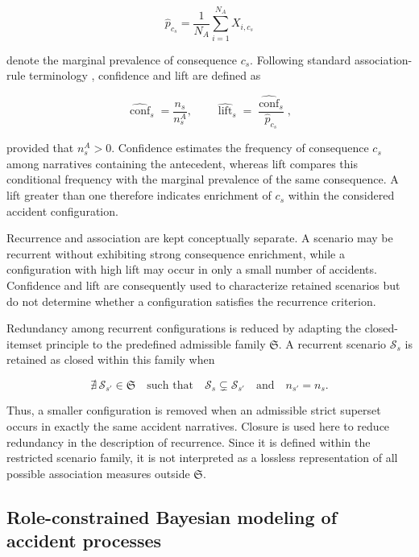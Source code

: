 \[
\widehat p_{c_s}
=
\frac{1}{N_A}
\sum_{i=1}^{N_A}X_{i,c_s}
\]

denote the marginal prevalence of consequence \(c_s\). Following standard
association-rule terminology
\citep{agrawal1993mining,brin1997dynamic}, confidence and lift are defined as

\[
\widehat{\operatorname{conf}}_s
=
\frac{n_s}{n_s^A},
\qquad
\widehat{\operatorname{lift}}_s
=
\frac{\widehat{\operatorname{conf}}_s}
     {\widehat p_{c_s}},
\]

provided that \(n_s^A>0\). Confidence estimates the frequency of consequence
\(c_s\) among narratives containing the antecedent, whereas lift compares this
conditional frequency with the marginal prevalence of the same consequence.
A lift greater than one therefore indicates enrichment of \(c_s\) within the
considered accident configuration.

Recurrence and association are kept conceptually separate. A scenario may be
recurrent without exhibiting strong consequence enrichment, while a
configuration with high lift may occur in only a small number of accidents.
Confidence and lift are consequently used to characterize retained scenarios
but do not determine whether a configuration satisfies the recurrence
criterion.

Redundancy among recurrent configurations is reduced by adapting the
closed-itemset principle \citep{pasquier1999discovering} to the predefined
admissible family \(\mathfrak S\). A recurrent scenario
\(\mathcal S_s\) is retained as closed within this family when

\[
\nexists\,
\mathcal S_{s'}\in\mathfrak S
\quad\text{such that}\quad
\mathcal S_s\subsetneq\mathcal S_{s'}
\quad\text{and}\quad
n_{s'}=n_s.
\]

Thus, a smaller configuration is removed when an admissible strict superset
occurs in exactly the same accident narratives. Closure is used here to
reduce redundancy in the description of recurrence. Since it is defined
within the restricted scenario family, it is not interpreted as a
lossless representation of all possible association measures outside
\(\mathfrak S\).


\subsection{Role-constrained Bayesian modeling of accident processes}
\label{sec:chap4_global_bn}

